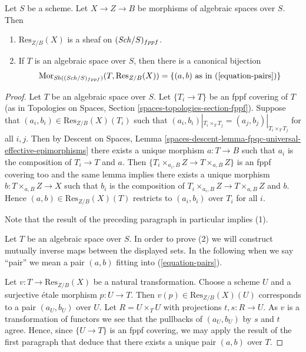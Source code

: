 \begin{lemma}
\label{lemma-restriction-of-scalars-sheaf}
Let $S$ be a scheme. Let $X \to Z \to B$ be morphisms of
algebraic spaces over $S$. Then
\begin{enumerate}
\item $\text{Res}_{Z/B}(X)$ is a sheaf on
$(\mathit{Sch}/S)_{fppf}$.
\item If $T$ is an algebraic space over $S$, then there is a
canonical bijection
$$
\mathop{\mathrm{Mor}}\nolimits_{\mathop{\mathit{Sh}}\nolimits((\mathit{Sch}/S)_{fppf})}(T, \text{Res}_{Z/B}(X))
=
\{(a, b)\text{ as in }(\ref{equation-pairs})\}
$$
\end{enumerate}
\end{lemma}

\begin{proof}
Let $T$ be an algebraic space over $S$. Let $\{T_i \to T\}$ be an fppf
covering of $T$ (as in
Topologies on Spaces, Section \ref{spaces-topologies-section-fppf}).
Suppose that $(a_i, b_i) \in \text{Res}_{Z/B}(X)(T_i)$ such
that $(a_i, b_i)|_{T_i \times_T T_j} = (a_j, b_j)|_{T_i \times_T T_j}$
for all $i, j$. Then by
Descent on Spaces,
Lemma \ref{spaces-descent-lemma-fpqc-universal-effective-epimorphisms}
there exists a unique morphism $a : T \to B$ such that $a_i$ is the
composition of $T_i \to T$ and $a$. Then
$\{T_i \times_{a_i, B} Z \to T \times_{a, B} Z\}$ is an fppf covering
too and the same lemma implies there exists a unique morphism
$b : T \times_{a, B} Z \to X$ such that $b_i$ is the composition
of $T_i \times_{a_i, B} Z \to T \times_{a, B} Z$ and $b$. Hence
$(a, b) \in \text{Res}_{Z/B}(X)(T)$ restricts to $(a_i, b_i)$
over $T_i$ for all $i$.

\medskip\noindent
Note that the result of the preceding paragraph in particular implies (1).

\medskip\noindent
Let $T$ be an algebraic space over $S$. In order to prove (2) we will
construct mutually inverse maps between the displayed sets. In the
following when we say ``pair'' we mean a pair $(a, b)$ fitting
into (\ref{equation-pairs}).

\medskip\noindent
Let $v : T \to \text{Res}_{Z/B}(X)$ be a natural transformation.
Choose a scheme $U$ and a surjective \'etale morphism $p : U \to T$.
Then $v(p) \in \text{Res}_{Z/B}(X)(U)$ corresponds to a pair $(a_U, b_U)$
over $U$. Let $R = U \times_T U$ with projections $t, s : R \to U$.
As $v$ is a transformation of functors we see that the pullbacks of
$(a_U, b_U)$ by $s$ and $t$ agree. Hence, since $\{U \to T\}$ is an
fppf covering, we may apply the result of the first paragraph that
deduce that there exists a unique pair $(a, b)$ over $T$.


\end{proof}
